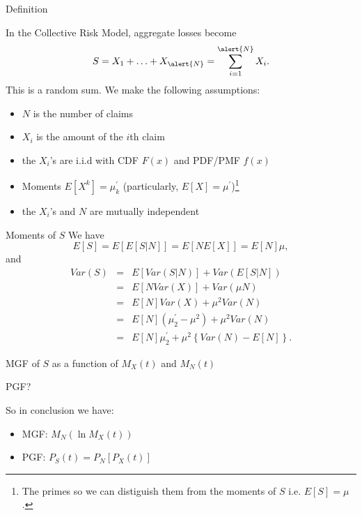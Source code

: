 \documentclass[11pt]{beamer}
\begin{document}
\begin{frame}{Definition}

In the Collective Risk Model, aggregate losses become
$$S=X_{1}+\ldots +X_{\alert{N}}=\sum_{i=1}^{\alert{N}}X_{i}.$$
This is a random sum. We make the following assumptions:
\begin{itemize}
\item $N$ is the number of claims
\item $X_i$ is the amount of the $i$th claim
\item the $X_i$'s are i.i.d with CDF $F(x)$ and PDF/PMF $f(x)$

\item Moments $E[X^k]=\mu^\prime_k$ (particularly, $E[X]=\mu^\prime$)\footnote{The primes so we can distiguish them from the moments of $S$ i.e. $E[S]=\mu$.}

\item the $X_i$'s and $N$ are mutually independent
\end{itemize}

\end{frame}
\begin{frame}{Moments of $S$}
We have
$$E[S]=E\left[ E[S|N] \right] = E\left[ N E[X] \right]= E[N]\mu,$$
and
\begin{eqnarray*}
Var(S)&=&E\left[ Var(S|N) \right] + Var\left( E[S|N] \right) \\
&=& E\left[ N Var(X) \right] + Var(\mu N) \\
&=& E[N] Var(X) + \mu^2 Var(N) \\
&=& E[N] (\mu_2^\prime - \mu^2)+ \mu^2 Var(N) \\
&=&  E[N]\mu_2^\prime + \mu^2 \left\{Var(N)-E[N] \right\}.
\end{eqnarray*}
\end{frame}
\begin{frame}{MGF of $S$ as a function of $M_X (t)$ and $M_N (t)$}

\end{frame}
\begin{frame}{PGF?}

\end{frame}
\begin{frame}

So in conclusion we have:

\begin{itemize}

\item MGF: $M_N\left(\ln M_X(t)\right)$

\vfill

\item PGF: $P_S (t) = P_N [ P_X (t) ]$

\end{itemize}

\end{frame}
\end{document}
